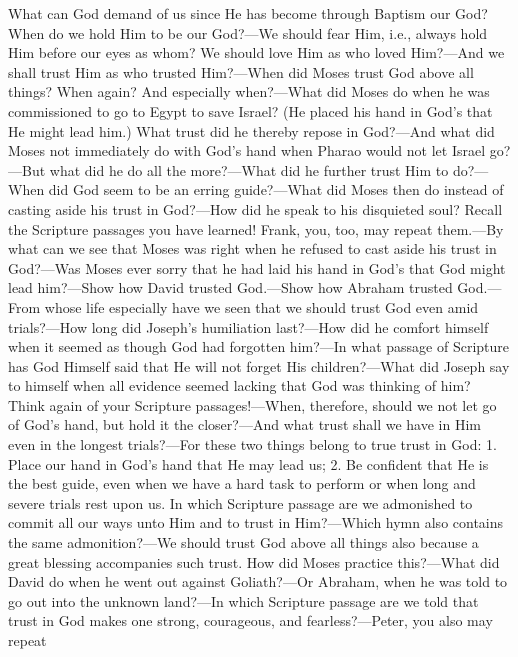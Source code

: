 What can God demand of us since He has become through Baptism our God? When do we hold Him to be our God?—We should fear Him, i.e., always hold Him before our eyes as whom? We should love Him as who loved Him?—And we shall trust Him as who trusted Him?—When did Moses trust God above all things? When again? And especially when?—What did Moses do when he was commissioned to go to Egypt to save Israel? (He placed his hand in God’s that He might lead him.) What trust did he thereby repose in God?—And what did Moses not immediately do with God’s hand when Pharao would not let Israel go?—But what did he do all the more?—What did he further trust Him to do?—When did God seem to be an erring guide?—What did Moses then do instead of casting aside his trust in God?—How did he speak to his disquieted soul? Recall the Scripture passages you have learned! Frank, you, too, may repeat them.—By what can we see that Moses was right when he refused to cast aside his trust in God?—Was Moses ever sorry that he had laid his hand in God’s that God might lead him?—Show how David trusted God.—Show how Abraham trusted God.—From whose life especially have we seen that we should trust God even amid trials?—How long did Joseph’s humiliation last?—How did he comfort himself when it seemed as though God had forgotten him?—In what passage of Scripture has God Himself said that He will not forget His children?—What did Joseph say to himself when all evidence seemed lacking that God was thinking of him? Think again of your Scripture passages!—When, therefore, should we not let go of God’s hand, but hold it the closer?—And what trust shall we have in Him even in the longest trials?—For these two things belong to true trust in God: 1. Place our hand in God’s hand that He may lead us; 2. Be confident that He is the best guide, even when we have a hard task to perform or when long and severe trials rest upon us. In which Scripture passage are we admonished to commit all our ways unto Him and to trust in Him?—Which hymn also contains the same admonition?—We should trust God above all things also because a great blessing accompanies such trust. How did Moses practice this?—What did David do when he went out against Goliath?—Or Abraham, when he was told to go out into the unknown land?—In which Scripture passage are we told that trust in God makes one strong, courageous, and fearless?—Peter, you also may repeat
